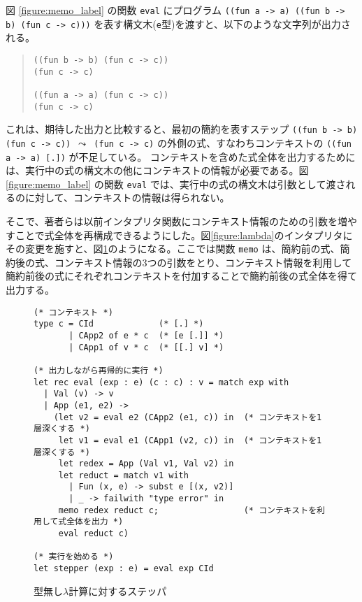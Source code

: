 図 \ref{figure:memo_label} の関数 \texttt{eval} にプログラム \texttt{((fun a -> a) ((fun b -> b) (fun c -> c)))} を表す構文木(\texttt{e}型)を渡すと、以下のような文字列が出力される。

\begin{quote}
\begin{verbatim}
((fun b -> b) (fun c -> c))
(fun c -> c)

((fun a -> a) (fun c -> c))
(fun c -> c)
\end{verbatim}
\end{quote}

これは、期待した出力と比較すると、最初の簡約を表すステップ \texttt{((fun b -> b) (fun c -> c)) $\leadsto$ (fun c -> c)} の外側の式、すなわちコンテキストの \texttt{((fun a -> a) [.])} が不足している。
コンテキストを含めた式全体を出力するためには、実行中の式の構文木の他にコンテキストの情報が必要である。図 \ref{figure:memo_label} の関数 \texttt{eval} では、実行中の式の構文木は引数として渡されるのに対して、コンテキストの情報は得られない。

そこで、著者らは以前\cite{FCA2019}インタプリタ関数にコンテキスト情報のための引数を増やすことで式全体を再構成できるようにした。図\ref{figure:lambda}のインタプリタにその変更を施すと、図\ref{figure:lambda_stepper}のようになる。ここでは関数 \texttt{memo} は、簡約前の式、簡約後の式、コンテキスト情報の3つの引数をとり、コンテキスト情報を利用して簡約前後の式にそれぞれコンテキストを付加することで簡約前後の式全体を得て出力する。

\begin{figure}
\begin{verbatim}
(* コンテキスト *)
type c = CId             (* [.] *)
       | CApp2 of e * c  (* [e [.]] *)
       | CApp1 of v * c  (* [[.] v] *)

(* 出力しながら再帰的に実行 *)
let rec eval (exp : e) (c : c) : v = match exp with
  | Val (v) -> v
  | App (e1, e2) ->
    (let v2 = eval e2 (CApp2 (e1, c)) in  (* コンテキストを1層深くする *)
     let v1 = eval e1 (CApp1 (v2, c)) in  (* コンテキストを1層深くする *)
     let redex = App (Val v1, Val v2) in
     let reduct = match v1 with
       | Fun (x, e) -> subst e [(x, v2)]
       | _ -> failwith "type error" in
     memo redex reduct c;                 (* コンテキストを利用して式全体を出力 *)
     eval reduct c)

(* 実行を始める *)
let stepper (exp : e) = eval exp CId
\end{verbatim}
\caption{型無し$\lambda$計算に対するステッパ}
\label{figure:lambda_stepper}
\end{figure}

